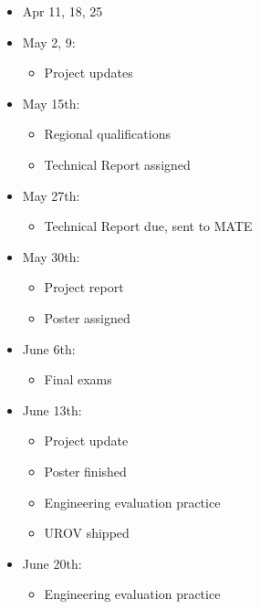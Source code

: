 \documentclass{proposalnsf}
\begin{document}
\begin{itemize}
\item Apr 11, 18, 25

\item May 2, 9:
    \begin{itemize} 
         \item Project updates
    \end{itemize}

\item May 15th:
    \begin{itemize} 
         \item Regional qualifications
         \item Technical Report assigned
    \end{itemize}

\item May 27th:
    \begin{itemize} 
         \item Technical Report due, sent to MATE
    \end{itemize}

\item May 30th:
    \begin{itemize} 
         \item Project report
         \item Poster assigned
    \end{itemize}

\item June 6th:
    \begin{itemize} 
        \item Final exams
    \end{itemize}

\item June 13th:
    \begin{itemize} 
         \item Project update
         \item Poster finished
         \item Engineering evaluation practice
         \item UROV shipped
    \end{itemize}

\item June 20th:
    \begin{itemize} 
        \item Engineering evaluation practice
    \end{itemize}
\end{itemize}
\end{document}
